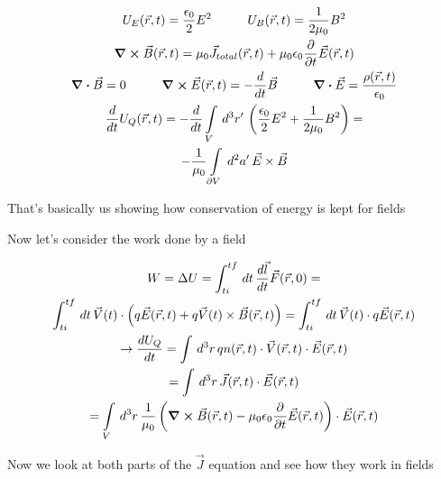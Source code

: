 \documentclass[fleqn]{report}
\newcommand{\hp}{\hspace{1cm}}
\newcommand{\del}{\partial}
\newcommand{\equations} [1] {
\begin{gather*}
#1
\end{gather*}
}
\begin{document}
\equations{
    U_{E}(\vec r, t)
    =
    \frac{\epsilon_0}{2} 
    E^2 
    \hp 
    U_{B}(\vec r, t)
    =
    \frac{1}{2 \mu_0}
    B^2
    \\
    \curl \vec B(\vec r, t)
    =
    \mu_0 \vec J_{total}(\vec r, t)
    +
    \mu_0 \epsilon_0 \frac{\del}{\del t} \vec E(\vec r, t)
    \\
    \div \vec B = 0 
    \hp 
    \curl \vec E(\vec r, t)
    =
    - \frac{d}{dt} \vec B
    \hp 
    \div \vec E 
    =
    \frac{\rho(\vec r, t)}{\epsilon_0}
    \\
    \frac{d}{dt} U_{Q}(\vec r, t) 
    =
    -\frac{d}{dt} 
    \int\limits_{V} \, d^3 r' \, 
    \left(
        \frac{\epsilon_0}{2} E^2 
        +
        \frac{1}{2 \mu_0} B^2
    \right)
    =
    \\
    - \frac{1}{\mu_0}
    \int\limits_{\del V} \, d^2 a' \, 
    \vec E \times \vec B
}

That's basically us showing how conservation of energy is kept for fields 

Now let's consider the work done by a field 

\equations{
    W = \Delta U 
    = 
    \int^{tf}_{ti} \, dt \, 
    \frac{d \vec l}{dt} \vec F(\vec r, 0)
    =
    \\
    \int^{tf}_{ti} \, dt \, 
    \vec V(t)
    \cdot 
    \left(
        q \vec E(\vec r, t)
        +
        q \vec V(t)
        \times 
        \vec B(\vec r, t)
    \right)
    =
    \int^{tf}_{ti} \, dt \, 
    \vec V(t)
    \cdot 
    q \vec E(\vec r, t)
    \\
    \rightarrow 
    \frac{dU_{Q}}{dt}
    = 
    \int \, d^3 r \, 
    q n(\vec r, t) \cdot \vec V(\vec r, t) \cdot \vec E(\vec r, t)
    \\
    =
    \int \, d^3 r \, 
    \vec J(\vec r, t) \cdot \vec E(\vec r, t)
    \\
    =
    \int\limits_{V} \, d^3 r \, 
    \frac{1}{\mu_0}
    \left(
        \curl \vec B(\vec r, t)
        -
        \mu_0 \epsilon_0 
        \frac{\del}{\del t}
        \vec E(\vec r, t)
    \right)
    \cdot 
    \vec E(\vec r, t)
}

Now we look at both parts of the $\vec J$ equation and see how they work 
in fields 
\end{document}
